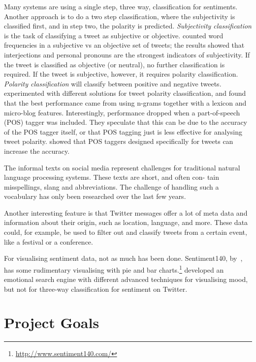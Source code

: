 Many systems are using a single step, three way, classification for sentiments. Another approach is to do a two step classification, where the subjectivity is classified first, and in step two, the polarity is predicted. \textit{Subjectivity classification} is the task of classifying a tweet as subjective or objective. \cite{article:pak} counted word frequencies in a subjective vs an objective set of tweets; the results showed that interjections and personal pronouns are the strongest indicators of subjectivity. If the tweet is classified as objective (or neutral), no further classification is required. If the tweet is subjective, however, it requires polarity classification. \textit{Polarity classification} will classify between positive and negative tweets.~\cite{article:omg} experimented with different solutions for tweet polarity classification, and found that the best performance came from using n-grams together with a lexicon and micro-blog features. Interestingly, performance dropped when a part-of-speech (POS) tagger was included. They speculate that this can be due to the accuracy of the POS tagger itself, or that POS tagging just is less effective for analysing tweet polarity. \cite{gimpel2010part} showed that POS taggers designed specifically for tweets can increase the accuracy.

The informal texts on social media represent challenges for traditional natural language processing systems. These texts are short, and often con- tain misspellings, slang and abbreviations. The challenge of handling such a vocabulary has only been researched over the last few years.

Another interesting feature is that Twitter messages offer a lot of meta data and information about their origin, such as location, language, and more. These data could, for example, be used to filter out and classify tweets from a certain event, like a festival or a conference.

For visualising sentiment data, not as much has been done. Sentiment140, by~\cite{article:gimpel}, has some rudimentary visualising with pie and bar charts.\footnote{\url{http://www.sentiment140.com/}} \cite{article:wefeelfine} developed an emotional search engine with different advanced techniques for visualising mood, but not for three-way classification for sentiment on Twitter.

\section{Project Goals}
\label{sec:projectgoals}


